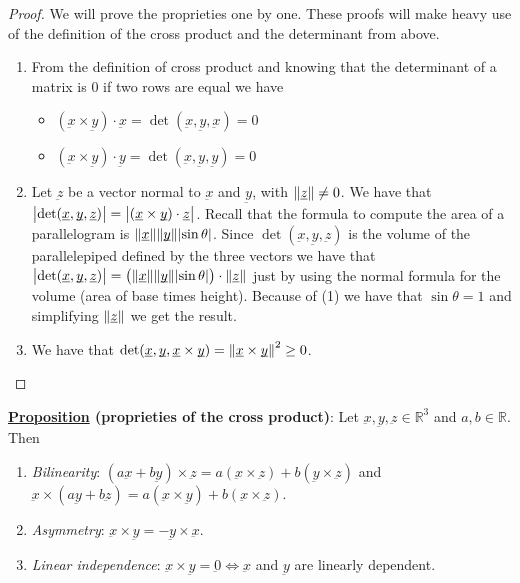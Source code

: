 \documentclass[10pt]{extarticle}
\newcommand{\R}{\mathbb{R}}
\newcommand{\munderbar}[1]{\underbar{\ensuremath{#1}}}
\begin{document}
\begin{proof}
    We will prove the proprieties one by one.
    These proofs will make heavy use of the definition of the cross product and the determinant from above.
    \begin{enumerate}
        \item From the definition of cross product and knowing that the determinant of a matrix is 0 if two rows are equal we have
              \begin{itemize}
                  \item $(\munderbar{x} \times \munderbar{y}) \cdot \munderbar{x} = \det (\munderbar{x}, \munderbar{y}, \munderbar{x}) = 0$
                  \item $(\munderbar{x} \times \munderbar{y}) \cdot \munderbar{y} = \det (\munderbar{x}, \munderbar{y}, \munderbar{y}) = 0$
              \end{itemize}
        \item Let $\munderbar{z}$ be a vector normal to $\munderbar{x}$ and $\munderbar{y}$, with $\norm{\munderbar{z}} \ne 0$.
              We have that $\abs{\det (\munderbar{x}, \munderbar{y}, \munderbar{z})} = \abs{(\munderbar{x} \times \munderbar{y}) \cdot \munderbar{z}}$.
              Recall that the formula to compute the area of a parallelogram is $\norm{\munderbar{x}} \norm{\munderbar{y}} \abs{\sin \theta}$.
              Since $\det (\munderbar{x}, \munderbar{y}, \munderbar{z})$ is the volume of the parallelepiped defined by the three vectors we have that
              $\abs{\det (\munderbar{x}, \munderbar{y}, \munderbar{z})} = \left(\norm{\munderbar{x}} \norm{\munderbar{y}} \abs{\sin \theta}\right) \cdot \norm{\munderbar{z}}$ just by using the normal formula for the volume (area of base times height).
              Because of (1) we have that $\sin \theta = 1$ and simplifying $\norm{\munderbar{z}}$ we get the result.
        \item We have that $\det (\munderbar{x}, \munderbar{y}, \munderbar{x} \times \munderbar{y}) = \norm{\munderbar{x} \times \munderbar{y}}^2 \geq 0$.
    \end{enumerate}
\end{proof}

\textbf{\underline{Proposition} (proprieties of the cross product)}:
Let $\munderbar{x}, \munderbar{y}, \munderbar{z} \in \R^3$ and $a, b \in \R$. Then

\begin{enumerate}
    \item \textit{Bilinearity}: $(a \munderbar{x} + b \munderbar{y}) \times \munderbar{z} = a (\munderbar{x} \times \munderbar{z}) + b (\munderbar{y} \times \munderbar{z})$ and $\munderbar{x} \times (a \munderbar{y} + b \munderbar{z}) = a (\munderbar{x} \times \munderbar{y}) + b (\munderbar{x} \times \munderbar{z})$.
    \item \textit{Asymmetry}: $\munderbar{x} \times \munderbar{y} = - \munderbar{y} \times \munderbar{x}$.
    \item \textit{Linear independence}: $\munderbar{x} \times \munderbar{y} = \munderbar{0} \iff \munderbar{x}$ and $\munderbar{y}$ are linearly dependent.
\end{enumerate}
\end{document}
